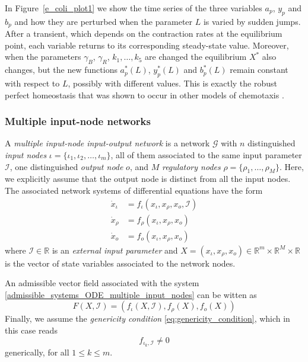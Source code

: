 \documentclass[a4paper,fleqn]{cas-dc}
\begin{document}
In Figure~\ref{e_coli_plot1} we show the time series of the three variables $a_p$, $y_p$ and $b_p$ and how they are perturbed when the parameter $L$ is varied by sudden jumps. After a transient, which depends on the contraction rates at the equilibrium point, each variable returns to its corresponding steady-state value. Moreover, when the parameters $\gamma_B$, $\gamma_R$, $k_1,\ldots,k_5$ are changed the equilibrium $X^*$ also changes, but the new functions $a_p^*(L)$, $y_p^*(L)$ and $b_p^*(L)$ remain constant with respect to $L$, possibly with different values.  This is exactly the robust perfect homeostasis that was shown to occur in other models of chemotaxis \cite{barkai1997,alon1999,mello2003,yi2000,kollmann2005,hansen2008}.

\subsubsection{Multiple input-node networks}

A \emph{multiple input-node input-output network} is a network $\mathcal{G}$ with $n$ distinguished \emph{input nodes} $\iota=\{\iota_{1}, \iota_{2}, \ldots, \iota_{m}\}$, all of them associated to the same input parameter $\mathcal{I}$, one distinguished \emph{output node} $o$, and $M$ \emph{regulatory nodes} $\rho=\{\rho_1,\ldots,\rho_M\}$.
Here, we explicitly assume that the output node is distinct from all the input nodes.
The associated network systems of differential equations have the form
\begin{equation} \label{admissible_systems_ODE_multiple_input_nodes}
\begin{aligned}
\dot{x}_{\iota} & = f_{\iota}(x_{\iota}, x_{\rho}, x_{o}, \mathcal{I}) \\
\dot{x}_{\rho} & = f_{\rho}(x_{\iota}, x_{\rho}, x_{o})\\
\dot{x}_{o} & = f_{o}(x_{\iota}, x_{\rho}, x_{o})
\end{aligned}
\end{equation}
where $\mathcal{I}\in\mathbb{R}$ is an \emph{external input parameter} and $X=(x_{\iota},x_{\rho},x_o)\in\mathbb{R}^m\times\mathbb{R}^M\times\mathbb{R}$ is the vector of state variables associated to the network nodes.

An admissible vector field associated with the system \eqref{admissible_systems_ODE_multiple_input_nodes} can be witten as
\[
F(X,\mathcal{I})=(f_{\iota}(X,\mathcal{I}),f_\rho(X),f_o(X))
\]
Finally, we assume the \emph{genericity condition}
\eqref{eq:genericity_condition}, which in this case reads
\begin{equation*} \label{e:f_iota_I}
 f_{\iota_k,\mathcal{I}} \neq 0
\end{equation*}
generically, for all $1 \leq k \leq m$.
\end{document}
